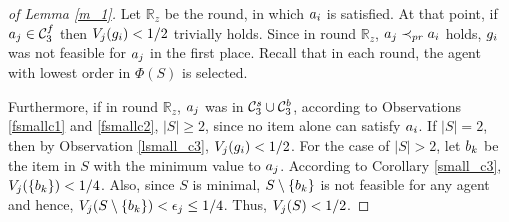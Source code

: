 \begin{proof}[of Lemma \ref{m_1}]
Let $\mathbb{R}_z$ be the round, in which $a_i$ is satisfied. At that point, if $a_j \in \mathcal{C}_3^f$ then $V_j(g_i) < {1/2}$ trivially holds. Since in round $\mathbb{R}_z$, $a_j \prec_{pr} a_i$ holds, $g_i$ was not feasible for $a_j$ in the first place. Recall that in each round, the agent with lowest order in $\Phi(S)$ is selected. 

Furthermore, if in round $\mathbb{R}_z$, $a_j$ was in $\mathcal{C}_3^s \cup \mathcal{C}_3^b$, according to Observations \ref{fsmallc1} and \ref{fsmallc2}, $|S| \geq 2$, since no item alone can satisfy $a_i$. If $|S|=2$, then by Observation \ref{lsmall_c3}, $V_j(g_i)<1/2$. For the case of $|S|>2$, let $b_k$ be the item in $S$ with the minimum value to $a_j$. According to Corollary \ref{small_c3}, $V_j(\{b_k\})<{1/4}$. Also, since $S$ is minimal, $S \setminus \{b_k\}$ is not feasible for any agent and hence, $V_j(S \setminus \{b_k\}) < \epsilon_j \leq {1/4}$. Thus, $V_j(S) < {1/2}$.
\end{proof}




\color{black}